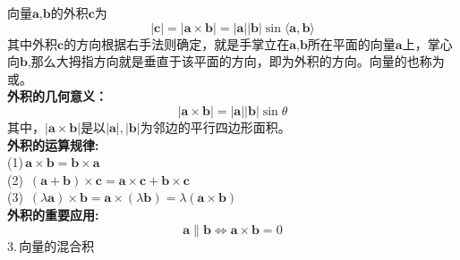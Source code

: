 \sj\sj
{}
向量$\boldsymbol{a}$,$\boldsymbol{b}$的外积$\boldsymbol{c}$为
\begin{equation}
	|\boldsymbol{c}|=|\boldsymbol{a}\times\boldsymbol{b}|=|\boldsymbol{a}||\boldsymbol{b}|\sin\langle\boldsymbol{a},\boldsymbol{b}\rangle
\end{equation}
其中外积$\boldsymbol{c}$的方向根据右手法则确定，就是手掌立在$\boldsymbol{a}$,$\boldsymbol{b}$所在平面的向量$\boldsymbol{a}$上，掌心向$\boldsymbol{b}$,那么大拇指方向就是垂直于该平面的方向，即为外积的方向。向量的也称为或。\\
\textbf{外积的几何意义：}
\begin{equation}
	|\boldsymbol{a}\times\boldsymbol{b}|=|\boldsymbol{a}||\boldsymbol{b}|\sin \theta
\end{equation}
其中，$|\boldsymbol{a}\times\boldsymbol{b}|$是以$|\boldsymbol{a}|,|\boldsymbol{b}|$为邻边的平行四边形面积。\\
\textbf{外积的运算规律:}\\
(1)$\,$\qquad $\boldsymbol{a}\times\boldsymbol{b}=\boldsymbol{b}\times\boldsymbol{a}$\\
(2)$\,$\qquad
$(\boldsymbol{a}+\boldsymbol{b})\times\boldsymbol{c}=\boldsymbol{a}\times\boldsymbol{c}+\boldsymbol{b}\times\boldsymbol{c}$\\
(3)$\,$\qquad
$(\lambda\boldsymbol{a})\times\boldsymbol{b}=\boldsymbol{a}\times(\lambda\boldsymbol{b})=\lambda(\boldsymbol{a}\times\boldsymbol{b})$\\
\textbf{外积的重要应用:}
\begin{equation}
	\boldsymbol{a}\parallel\boldsymbol{b}\Leftrightarrow \boldsymbol{a}\times\boldsymbol{b}=0
\end{equation}
3.$\,$向量的混合积\\

